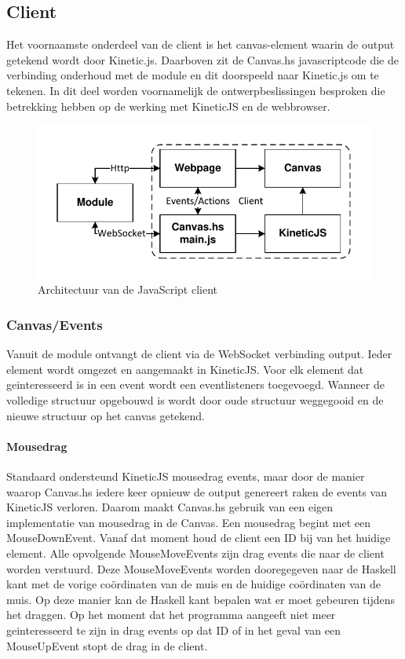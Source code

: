 
\subsection{Client}
Het voornaamste onderdeel van de client is het canvas-element waarin de output getekend wordt door Kinetic.js. Daarboven zit de Canvas.hs javascriptcode die de verbinding onderhoud met de module en dit doorspeeld naar Kinetic.js om te tekenen. In dit deel worden voornamelijk de ontwerpbeslissingen besproken die betrekking hebben op de werking met KineticJS en de webbrowser.

\begin{figure}
\begin{center}
\includegraphics[keepaspectratio,width=\textwidth]{./images/client_architecture.pdf}
\caption{Architectuur van de JavaScript client}
\label{fig:architecture_client}
\end{center}
\end{figure}

\subsubsection{Canvas/Events}
Vanuit de module ontvangt de client via de WebSocket verbinding output. Ieder element wordt omgezet en aangemaakt in KineticJS. Voor elk element dat geinteresseerd is in een event wordt een eventlisteners toegevoegd. Wanneer de volledige structuur opgebouwd is wordt door oude structuur weggegooid en de nieuwe structuur op het canvas getekend.

\paragraph{Mousedrag}
Standaard ondersteund KineticJS mousedrag events, maar door de manier waarop Canvas.hs iedere keer opnieuw de output genereert raken de events van KineticJS verloren. Daarom maakt Canvas.hs gebruik van een eigen implementatie van mousedrag in de Canvas. Een mousedrag begint met een MouseDownEvent. Vanaf dat moment houd de client een ID bij van het huidige element. Alle opvolgende MouseMoveEvents zijn drag events die naar de client worden verstuurd. Deze MouseMoveEvents worden dooregegeven naar de Haskell kant met de vorige coördinaten van de muis en de huidige coördinaten van de muis.
Op deze manier kan de Haskell kant bepalen wat er moet gebeuren tijdens het draggen. Op het moment dat het programma aangeeft niet meer geinteresseerd te zijn in drag events op dat ID of in het geval van een MouseUpEvent stopt de drag in de client.

